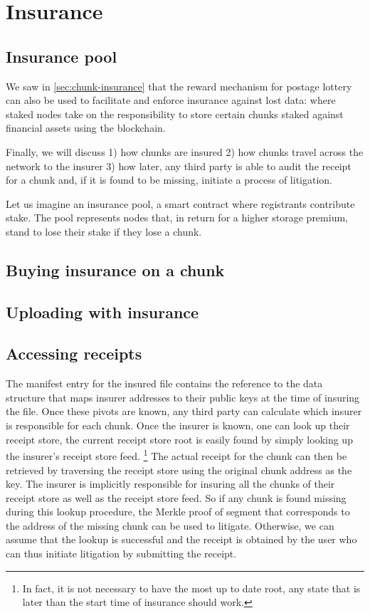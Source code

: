 \section{Insurance \statusorange}\label{sec:insurance}
 

\subsection{Insurance pool \statusorange}
We saw in \ref{sec:chunk-insurance} that the reward mechanism for postage lottery can also be used to facilitate and enforce insurance against lost data: where staked nodes take on the responsibility to store certain chunks staked against financial assets using the blockchain. 

Finally, we will discuss  1) how chunks are insured 2) how chunks travel across the network to the insurer 3) how later, any third party is able to audit the receipt for a chunk and, if it is found to be missing, initiate a process of litigation.

Let us imagine an insurance pool, a smart contract where registrants contribute stake. The pool represents nodes that, in return for a higher storage premium, stand to lose their stake if they lose a chunk. 

\subsection{Buying insurance on a chunk \statusred}

\subsection{Uploading with insurance \statusred}


\subsection{Accessing receipts \statusred}

The manifest entry for the insured file contains the reference to the data structure that maps insurer addresses to their public keys at the time of insuring the file. Once these pivots are known, any third party can calculate which insurer is responsible for each chunk. Once the insurer is known, one can look up their receipt store, the current receipt store root is easily found by simply looking up the insurer's receipt store feed.%
%
\footnote{In fact, it is not necessary to have the most up to date root, any state that is later than the start time of insurance should work.}
%
The actual receipt for the chunk can then be retrieved by traversing the receipt store using the original chunk address as the key. The insurer is implicitly responsible for insuring all the chunks of their receipt store as well as the receipt store feed. So if any chunk is found missing during this lookup procedure, the Merkle proof of segment that corresponds to the address of the missing chunk can be used to litigate. 
Otherwise, we can assume that the lookup is successful and the receipt is obtained by the user who can thus initiate litigation by submitting the receipt. 


